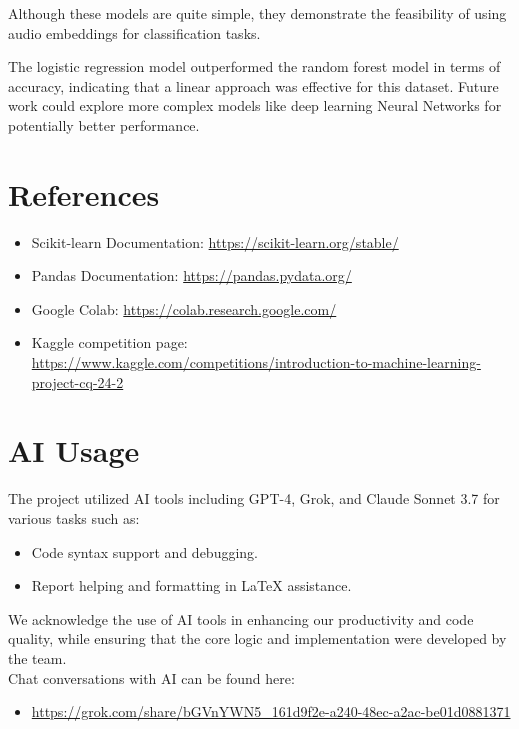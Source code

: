 \documentclass[12pt, a4paper]{article}
\begin{document}
\indent Although these models are quite simple, they demonstrate the feasibility of using audio embeddings for classification tasks.

\indent The logistic regression model outperformed the random forest model in terms of accuracy, indicating that a linear approach was effective for this dataset. Future work could explore more complex models like deep learning Neural Networks for potentially better performance.

\section{References}
\begin{itemize}
    \item Scikit-learn Documentation: \url{https://scikit-learn.org/stable/}
    \item Pandas Documentation: \url{https://pandas.pydata.org/}
    \item Google Colab: \url{https://colab.research.google.com/}
    \item Kaggle competition page: \\
        \url{https://www.kaggle.com/competitions/introduction-to-machine-learning-project-cq-24-2}
\end{itemize}

\section{AI Usage}
The project utilized AI tools including GPT-4, Grok, and Claude Sonnet 3.7 for various tasks such as:

\begin{itemize}
    \item Code syntax support and debugging.
    \item Report helping and formatting in LaTeX assistance.
\end{itemize}

We acknowledge the use of AI tools in enhancing our productivity and code quality, while ensuring that the core logic and implementation were developed by the team.\\
\indent Chat conversations with AI can be found here:
\begin{itemize}
    \item \url{https://grok.com/share/bGVnYWN5_161d9f2e-a240-48ec-a2ac-be01d0881371}
\end{itemize}
\end{document}

